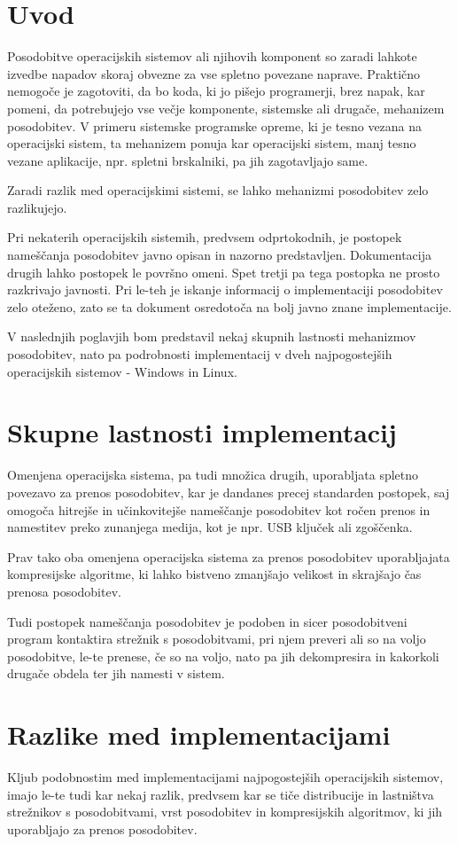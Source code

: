 \section{Uvod}

Posodobitve operacijskih sistemov ali njihovih komponent so zaradi lahkote izvedbe napadov skoraj obvezne za vse
spletno povezane naprave.
Praktično nemogoče je zagotoviti, da bo koda, ki jo pišejo programerji, brez napak, kar pomeni, da potrebujejo
vse večje komponente, sistemske ali drugače, mehanizem posodobitev.
V primeru sistemske programske opreme, ki je tesno vezana na operacijski sistem, ta mehanizem ponuja kar operacijski
sistem, manj tesno vezane aplikacije, npr. spletni brskalniki, pa jih zagotavljajo same.

Zaradi razlik med operacijskimi sistemi, se lahko mehanizmi posodobitev zelo razlikujejo.

Pri nekaterih operacijskih sistemih, predvsem odprtokodnih, je postopek nameščanja posodobitev javno opisan in
nazorno predstavljen.
Dokumentacija drugih lahko postopek le površno omeni.
Spet tretji pa tega postopka ne prosto razkrivajo javnosti.
Pri le-teh je iskanje informacij o implementaciji posodobitev zelo oteženo, zato se ta dokument osredotoča na bolj
javno znane implementacije.

V naslednjih poglavjih bom predstavil nekaj skupnih lastnosti mehanizmov posodobitev, nato pa podrobnosti
implementacij v dveh najpogostejših operacijskih sistemov - Windows in Linux.

\section{Skupne lastnosti implementacij}

Omenjena operacijska sistema, pa tudi množica drugih, uporabljata spletno povezavo za prenos posodobitev,
kar je dandanes precej standarden postopek, saj omogoča hitrejše in učinkovitejše nameščanje posodobitev
kot ročen prenos in namestitev preko zunanjega medija, kot je npr. USB ključek ali zgoščenka.

Prav tako oba omenjena operacijska sistema za prenos posodobitev uporabljajata kompresijske algoritme,
ki lahko bistveno zmanjšajo velikost in skrajšajo čas prenosa posodobitev.

Tudi postopek nameščanja posodobitev je podoben in sicer posodobitveni program kontaktira strežnik s posodobitvami,
pri njem preveri ali so na voljo posodobitve, le-te prenese, če so na voljo, nato pa jih dekompresira in
kakorkoli drugače obdela ter jih namesti v sistem.

\section{Razlike med implementacijami}

Kljub podobnostim med implementacijami najpogostejših operacijskih sistemov, imajo le-te tudi kar nekaj razlik,
predvsem kar se tiče distribucije in lastništva strežnikov s posodobitvami, vrst posodobitev in kompresijskih
algoritmov, ki jih uporabljajo za prenos posodobitev.